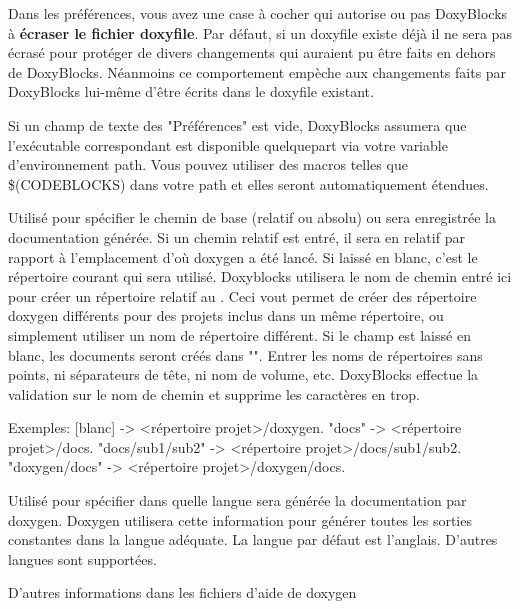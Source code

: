 \begin{description}
\item Dans les préférences, vous avez une case à cocher qui autorise ou pas DoxyBlocks à \textbf{écraser le fichier doxyfile}. Par défaut, si un doxyfile existe déjà il ne sera pas écrasé pour protéger de divers changements qui auraient pu être faits en dehors de DoxyBlocks. Néanmoins ce comportement empèche aux changements faits par DoxyBlocks lui-même d'être écrits dans le doxyfile existant.
\item Si un champ de texte des "Préférences" est vide, DoxyBlocks assumera que l'exécutable correspondant est disponible quelquepart via votre variable d'environnement path. Vous pouvez utiliser des macros telles que \$(CODEBLOCKS) dans votre path et elles seront automatiquement étendues.
\item [OUTPUT\_DIRECTORY] Utilisé pour spécifier le chemin de base (relatif ou absolu) ou sera enregistrée la documentation générée. Si un chemin relatif est entré, il sera en relatif par rapport à l'emplacement d'où doxygen a été lancé. Si laissé en blanc, c'est le répertoire courant qui sera utilisé. Doxyblocks utilisera le nom de chemin entré ici pour créer un répertoire relatif au . Ceci vout permet de créer des répertoire doxygen différents pour des projets inclus dans un même répertoire, ou simplement utiliser un nom de répertoire différent. Si le champ est laissé en blanc, les documents seront créés dans "". Entrer les noms de répertoires sans points, ni séparateurs de tête, ni nom de volume, etc. DoxyBlocks effectue la validation sur le nom de chemin et supprime les caractères en trop.
\begin{code}
Exemples:
[blanc]           -> <répertoire projet>/doxygen.
"docs"            -> <répertoire projet>/docs.
"docs/sub1/sub2"  -> <répertoire projet>/docs/sub1/sub2.
"doxygen/docs"    -> <répertoire projet>/doxygen/docs.
\end{code}
\item [OUTPUT\_LANGUAGE]  Utilisé pour spécifier dans quelle langue sera générée la documentation par doxygen. Doxygen utilisera cette information pour générer toutes les sorties constantes dans la langue adéquate. La langue par défaut est l'anglais. D'autres langues sont supportées. 
\item D'autres informations dans les fichiers d'aide de doxygen
\end{description}